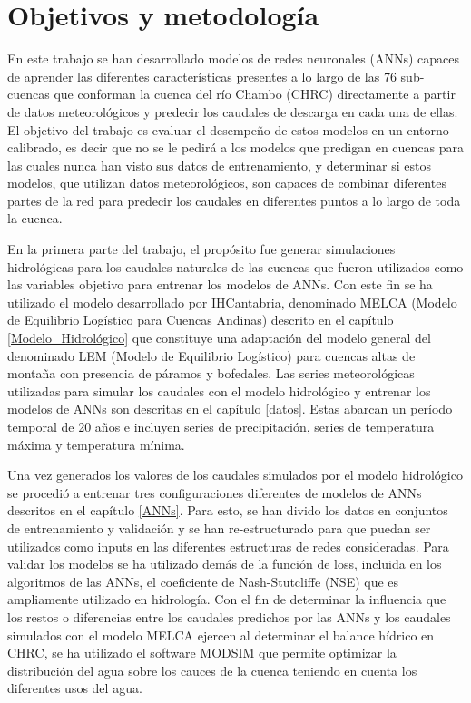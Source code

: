 

\section{Objetivos y metodología}

En este trabajo se han desarrollado modelos de redes neuronales (ANNs) capaces de aprender las diferentes características presentes a lo largo
de las 76 sub-cuencas que conforman la cuenca del río Chambo (CHRC) directamente a partir de datos meteorológicos y predecir los caudales de 
descarga en cada una de ellas. 
El objetivo del trabajo es evaluar el desempeño de estos modelos en un entorno calibrado, es decir que no se le pedirá
a los modelos que predigan en cuencas para las cuales nunca han visto sus datos de entrenamiento, 
y  determinar si estos modelos, que utilizan datos  meteorológicos, 
son capaces de combinar diferentes partes de la red para predecir los caudales en diferentes puntos a lo largo de toda la cuenca. 

En la primera parte del trabajo, el propósito fue generar simulaciones hidrológicas para los caudales naturales de las cuencas 
que fueron utilizados como las variables objetivo para entrenar los modelos de ANNs. Con este fin se ha utilizado el modelo 
desarrollado por IHCantabria, denominado MELCA (Modelo de Equilibrio Logístico para Cuencas Andinas) descrito en el capítulo \ref{Modelo_Hidrológico} 
que constituye una adaptación del modelo general del denominado LEM (Modelo de Equilibrio Logístico) para cuencas 
altas de montaña con presencia de páramos y bofedales. Las series meteorológicas utilizadas para simular los caudales con el modelo  hidrológico 
y entrenar los modelos de ANNs son descritas en el capítulo \ref{datos}. Estas abarcan un período temporal de 20 años e incluyen series de 
precipitación, series de temperatura máxima y temperatura mínima.  

Una vez generados los valores de los caudales simulados por el modelo hidrológico se procedió a entrenar tres configuraciones
diferentes de modelos de ANNs descritos en el capítulo \ref{ANNs}. Para esto, se han divido los datos en conjuntos de entrenamiento y 
validación y se han re-estructurado para que puedan ser utilizados como inputs en las diferentes estructuras de redes consideradas. 
Para validar los modelos se ha utilizado demás de la función de loss, incluida en los algoritmos de las ANNs, el coeficiente de
Nash-Stutcliffe (NSE) que es ampliamente utilizado en hidrología. Con el fin de determinar 
la influencia que los restos o diferencias entre los caudales predichos por las ANNs y los caudales simulados con 
el modelo MELCA ejercen al determinar el balance hídrico en CHRC, se ha utilizado el software MODSIM que permite 
optimizar la distribución del agua sobre los cauces de la cuenca teniendo en cuenta los diferentes usos del agua.

